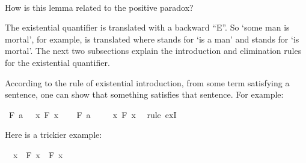 \begin{isabellebody}
\isadelimproof
\ %
\endisadelimproof
%
\isatagproof
{}\isamarkupfalse%
%
\endisatagproof
{\isafoldproof}%
%
\isadelimproof
%
\endisadelimproof
%
\begin{isamarkuptext}%
How is this lemma related to the positive paradox?%
\end{isamarkuptext}\isamarkuptrue%
%
\isadelimdocument
%
\endisadelimdocument
%
\isatagdocument
%
\isamarkuptrue%
%
\endisatagdocument
{\isafolddocument}%
%
\isadelimdocument
%
\endisadelimdocument
%
\begin{isamarkuptext}%
The existential quantifier is translated with a backward ``E''. So `some man is mortal', for
example, is translated  where  stands for `is a man'
and  stands for `is mortal'. The next two subsections explain the introduction and
elimination rules for the existential quantifier.%
\end{isamarkuptext}\isamarkuptrue%
%
\isadelimdocument
%
\endisadelimdocument
%
\isatagdocument
%
\isamarkuptrue%
%
\endisatagdocument
{\isafolddocument}%
%
\isadelimdocument
%
\endisadelimdocument
%
\begin{isamarkuptext}%
According to the rule of existential introduction, from some term satisfying a sentence,
one can show that something satisfies that sentence. For example:%
\end{isamarkuptext}\isamarkuptrue%
\isamarkupfalse%
\ {\isachardoublequoteopen}F\ a\ {\isasymlongrightarrow}\ {\isacharparenleft}{\isasymexists}\ x{\isachardot}\ F\ x{\isacharparenright}{\isachardoublequoteclose}\isanewline
%
\isadelimproof
%
\endisadelimproof
%
\isatagproof
{}\isamarkupfalse%
\isanewline
\ \ \isamarkupfalse%
\ {\isachardoublequoteopen}F\ a{\isachardoublequoteclose}\isanewline
\ \ \isamarkupfalse%
\ {\isachardoublequoteopen}{\isasymexists}\ x{\isachardot}\ F\ x{\isachardoublequoteclose}\ \isamarkupfalse%
\ {\isacharparenleft}rule\ exI{\isacharparenright}\isanewline
{}\isamarkupfalse%
%
\endisatagproof
{\isafoldproof}%
%
\isadelimproof
%
\endisadelimproof
%
\begin{isamarkuptext}%
Here is a trickier example:%
\end{isamarkuptext}\isamarkuptrue%
\isamarkupfalse%
\ {\isachardoublequoteopen}{\isasymexists}\ x{\isachardot}\ {\isasymnot}\ F\ x\ {\isasymor}\ F\ x{\isachardoublequoteclose}\isanewline

\end{isabellebody}
